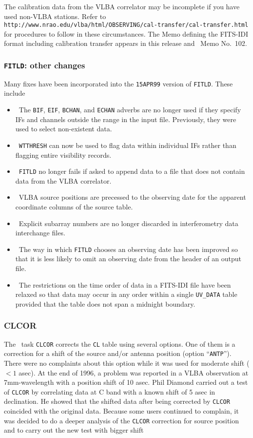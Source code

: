The calibration data from the VLBA correlator may be incomplete if you
have used non-VLBA stations. Refer to
{\tt http://www.nrao.edu/vlba/html/OBSERVING/cal-transfer/cal-transfer.html }
for procedures to follow in these circumstances.  The Memo defining
the FITS-IDI format including calibration transfer appears in this
release and \AIPS\ Memo No.~102.

\subsubsection{{\tt FITLD}: other changes}

Many fixes have been incorporated into the {\tt 15APR99} version of
{\tt FITLD}\@. These include
\begin{itemize}
\item\ The {\tt BIF}, {\tt EIF}, {\tt BCHAN}, and {\tt ECHAN} adverbs
    are no longer used if they specify IFs and channels outside the
    range in the input file.  Previously, they were used to select
    non-existent data.
\item\ {\tt WTTHRESH} can now be used to flag data within individual
    IFs rather than flagging entire visibility records.
\item\ {\tt FITLD} no longer fails if asked to append data to a file
    that does not contain data from the VLBA correlator.
\item\ VLBA source positions are precessed to the observing date for
    the apparent coordinate columns of the source table.
\item\ Explicit subarray numbers are no longer discarded in
    interferometry data interchange files.
\item\ The way in which {\tt FITLD} chooses an observing date has been
    improved so that it is less likely to omit an observing date from
    the header of an output file.
\item\ The restrictions on the time order of data in a FITS-IDI file
    have been relaxed so that data may occur in any order within a
    single {\tt UV\_DATA} table provided that the table does not span
    a midnight boundary.
\end{itemize}

\subsubsection{CLCOR}

The \AIPS\ task {\tt CLCOR} corrects the {\tt CL} table using several
options.  One of them is a correction for a shift of the source and/or
antenna position (option ``{\tt ANTP}'').  There were no complaints
about this option while it was used for moderate shift ($<1$ asec). At
the end of 1996, a problem was reported in a VLBA observation at
7mm-wavelength with a position shift of 10 asec.  Phil Diamond carried
out a test of {\tt CLCOR} by correlating data at C band with a known
shift of 5 asec in declination.  He showed that the shifted data after
being corrected by {\tt CLCOR} coincided with the original data.
Because some users continued to complain, it was decided to do a
deeper analysis of the {\tt CLCOR} correction for source position
and to carry out the new test with bigger shift

